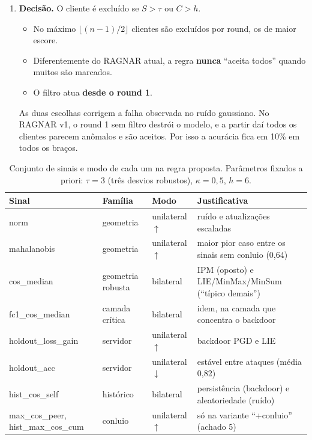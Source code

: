 \documentclass[11pt,a4paper]{article}
\begin{document}
\begin{enumerate}
  \item \textbf{Decisão.} O cliente é excluído se $S > \tau$ ou $C > h$.
        \begin{itemize}
          \item No máximo $\lfloor (n-1)/2 \rfloor$ clientes são excluídos por round, os de maior escore.
          \item Diferentemente do RAGNAR atual, a regra \textbf{nunca} ``aceita todos'' quando muitos são
                marcados.
          \item O filtro atua \textbf{desde o round 1}.
        \end{itemize}
        As duas escolhas corrigem a falha observada no ruído gaussiano. No RAGNAR v1, o round 1 sem filtro
        destrói o modelo, e a partir daí todos os clientes parecem anômalos e são aceitos. Por isso a
        acurácia fica em 10\% em todos os braços.
\end{enumerate}

\begin{table}[htbp]
\centering
\small
\caption{Conjunto de sinais e modo de cada um na regra proposta. Parâmetros fixados a priori:
$\tau = 3$ (três desvios robustos), $\kappa = 0{,}5$, $h = 6$.}
\label{tab:regra}
\begin{tabular}{p{3.2cm}p{2.6cm}p{2.9cm}p{7.2cm}}
\toprule
\textbf{Sinal} & \textbf{Família} & \textbf{Modo} & \textbf{Justificativa} \\
\midrule
\rowcolor{lightbg} norm & geometria & unilateral $\uparrow$ & ruído e atualizações escaladas \\
mahalanobis & geometria & unilateral $\uparrow$ & maior pior caso entre os sinais sem conluio (0,64) \\
\rowcolor{lightbg} cos\_median & geometria robusta & bilateral & IPM (oposto) e LIE/MinMax/MinSum (``típico demais'') \\
fc1\_cos\_median & camada crítica & bilateral & idem, na camada que concentra o backdoor \\
\rowcolor{lightbg} holdout\_loss\_gain & servidor & unilateral $\uparrow$ & backdoor PGD e LIE \\
holdout\_acc & servidor & unilateral $\downarrow$ & estável entre ataques (média 0,82) \\
\rowcolor{lightbg} hist\_cos\_self & histórico & bilateral & persistência (backdoor) e aleatoriedade (ruído) \\
\midrule
max\_cos\_peer, hist\_max\_cos\_cum & conluio & unilateral $\uparrow$ & só na variante ``+conluio'' (achado 5) \\
\bottomrule
\end{tabular}
\end{table}
\end{document}
